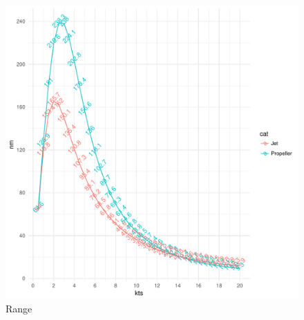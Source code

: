 \documentclass{article}\usepackage[]{graphicx}\usepackage[]{color}
\makeatletter
\def\maxwidth{ %
  \ifdim\Gin@nat@width>\linewidth
    \linewidth
  \else
    \Gin@nat@width
  \fi
}
\newenvironment{knitrout}{}{} %
\makeatother
\begin{document}
\begin{figure}
\begin{knitrout}
\color{fgcolor}

{\centering \includegraphics[width=\maxwidth]{figures/plots-plot_range-1} 

}



\end{knitrout}
\caption{Range}
\label{fig:Range_plot}
\end{figure}
\end{document}
